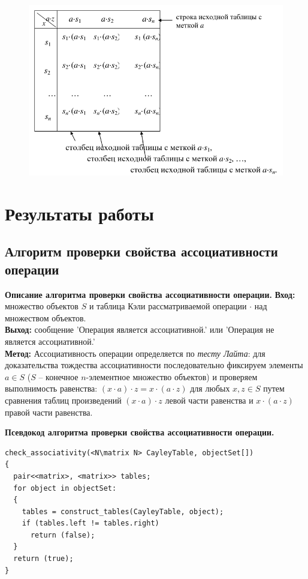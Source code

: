 \documentclass[spec, och, otchet, hidelinks]{SCWorks}
\newcommand{\tbf}[1]{\textbf{#1}}
\begin{document}
\begin{figure}[h]
  \center\includegraphics[scale=0.5]{right_cayley.png}
\end{figure}

\newpage

\section{Результаты работы}

\subsection{Алгоритм проверки свойства ассоциативности операции}
\par \tbf{Описание алгоритма проверки свойства ассоциативности операции.}
\tbf{Вход:} множество объектов $S$ и таблица Кэли рассматриваемой операции
$\cdot$ над множеством объектов. \\
\tbf{Выход:} сообщение 'Операция является ассоциативной.' или 'Операция не
является ассоциативной.' \\
\tbf{Метод:} Ассоциативность операции определяется по \textit{тесту Лайта}:
для доказательства тождества ассоциативности последовательно фиксируем элементы
$a \in S $ ($S$ -- конечное $n$-элементное множество объектов) и проверяем выполнимость равенства:
$(x \cdot a) \cdot z = x \cdot (a \cdot z)$ для любых $x, z \in S$ путем
сравнения таблиц произведений $(x \cdot a) \cdot z$ левой части равенства и $x
\cdot (a \cdot z)$ правой части равенства.

\par \tbf{Псевдокод алгоритма проверки свойства ассоциативности операции.}
\begin{lstlisting}[caption=Псевдокод алгоритма., mathescape]
check_associativity(<N\matrix N> CayleyTable, objectSet[])
{
  pair<<matrix>, <matrix>> tables;
  for object in objectSet:
  {
    tables = construct_tables(CayleyTable, object);
    if (tables.left != tables.right)
      return (false);
  }
  return (true);
}
\end{lstlisting}
\end{document}
